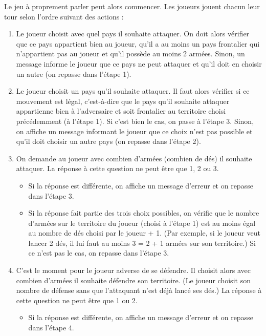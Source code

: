 \vspace{0.3cm}
Le jeu à proprement parler peut alors commencer. Les joueurs jouent chacun leur tour selon l'ordre suivant des actions :
\begin{enumerate}
    \item Le joueur choisit avec quel pays il souhaite attaquer. On doit alors vérifier que ce pays appartient bien au joueur, qu'il a au moins un pays frontalier qui n'appartient pas au joueur et qu'il possède au moins 2 armées. Sinon, un message informe le joueur que ce pays ne peut attaquer et qu'il doit en choisir un autre (on repasse dans l'étape 1).
    \vspace{0.2cm}
    \item Le joueur choisit un pays qu'il souhaite attaquer. Il faut alors vérifier si ce mouvement est légal, c'est-à-dire que le pays qu'il souhaite attaquer appartienne bien à l'adversaire et soit frontalier au territoire choisi précédemment (à l'étape 1). Si c'est bien le cas, on passe à l'étape 3. Sinon, on affiche un message informant le joueur que ce choix n'est pas possible et qu'il doit choisir un autre pays (on repasse dans l'étape 2).
    \vspace{0.2cm}
    \item On demande au joueur avec combien d'armées (combien de dés) il souhaite attaquer. La réponse à cette question ne peut être que 1, 2 ou 3.
    \begin{itemize}
        \item Si la réponse est différente, on affiche un message d'erreur et on repasse dans l'étape 3.
        \item Si la réponse fait partie des trois choix possibles, on vérifie que le nombre d'armées sur le territoire du joueur (choisi à l'étape 1) est au moins égal au nombre de dés choisi par le joueur + 1. (Par exemple, si le joueur veut lancer 2 dés, il lui faut au moins 3 = 2 + 1 armées sur son territoire.) Si ce n'est pas le cas, on repasse dans l'étape 3.
    \end{itemize}
    \vspace{0.2cm}
    \item C'est le moment pour le joueur adverse de se défendre. Il choisit alors avec combien d'armées il souhaite défendre son territoire. (Le joueur choisit son nombre de défense sans que l'attaquant n'est déjà lancé ses dés.) La réponse à cette question ne peut être que 1 ou 2. 
    \begin{itemize}
        \item Si la réponse est différente, on affiche un message d'erreur et on repasse dans l'étape 4.

\end{itemize}
\end{enumerate}
